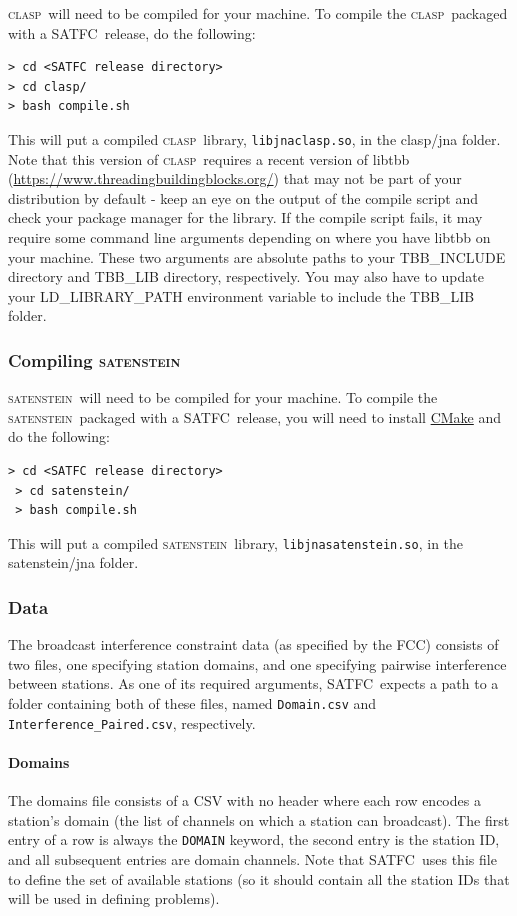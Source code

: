 \documentclass[
10pt, %
letterpaper, %
oneside, %
headinclude,footinclude, %
BCOR5mm, %
needspace, %
]{scrartcl}
\newcommand{\SATFC}{\textsc{SATFC}~}
\newcommand{\clasp}{\textsc{clasp}~}
\newcommand{\satenstein}{\textsc{satenstein}~}
\begin{document}
\clasp will need to be compiled for your machine. To compile the \clasp packaged with a \SATFC release, do the following:
\begin{lstlisting}[style=Bash]
> cd <SATFC release directory>
> cd clasp/
> bash compile.sh
\end{lstlisting}
This will put a compiled \clasp library, \texttt{libjnaclasp.so}, in the clasp/jna folder.
Note that this version of \clasp requires a recent version of libtbb (\url{https://www.threadingbuildingblocks.org/}) that may not be part of your distribution by default - keep an eye on the output of the compile script and check your package manager for the library. If the compile script fails, it may require some command line arguments depending on where you have libtbb on your machine. These two arguments are absolute paths to your TBB\_INCLUDE directory and TBB\_LIB directory, respectively. You may also have to update your LD\_LIBRARY\_PATH environment variable to include the TBB\_LIB folder.

\subsubsection{Compiling \satenstein}
 
 \satenstein will need to be compiled for your machine. To compile the \satenstein packaged with a \SATFC release, you will need to install \href{https://cmake.org/}{CMake} and do the following:
 \begin{lstlisting}[style=Bash]
 > cd <SATFC release directory>
 > cd satenstein/
 > bash compile.sh
\end{lstlisting}
This will put a compiled \satenstein library, \texttt{libjnasatenstein.so}, in the satenstein/jna folder.

\subsubsection{Data}\label{sec:data}

The broadcast interference constraint data (as specified by the FCC) consists of two files, one specifying station domains, and one specifying pairwise interference between stations. As one of its required arguments, \SATFC expects a path to a folder containing both of these files, named \texttt{Domain.csv} and \texttt{Interference\_Paired.csv}, respectively.

\paragraph{Domains} The domains file consists of a CSV with no header where each row encodes a station's domain (the list of channels on which a station can broadcast). The first entry of a row is always the \texttt{DOMAIN} keyword, the second entry is the station ID, and all subsequent entries are domain channels. Note that \SATFC uses this file to define the set of available stations (so it should contain all the station IDs that will be used in defining problems).
\end{document}
